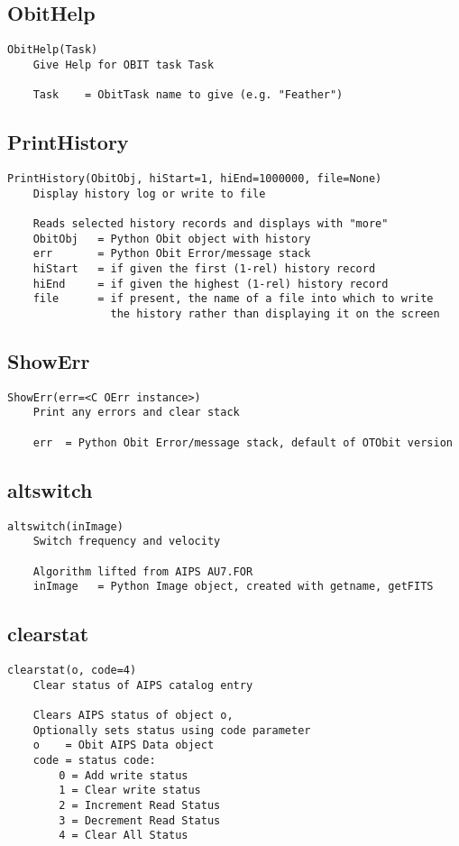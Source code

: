 \documentclass[11pt]{report}
\begin{document}
\subsection{ObitHelp}
\begin{verbatim}
ObitHelp(Task)
    Give Help for OBIT task Task
    
    Task    = ObitTask name to give (e.g. "Feather")
\end{verbatim}

\subsection{PrintHistory}
\begin{verbatim}
PrintHistory(ObitObj, hiStart=1, hiEnd=1000000, file=None)
    Display history log or write to file
    
    Reads selected history records and displays with "more"
    ObitObj   = Python Obit object with history
    err       = Python Obit Error/message stack
    hiStart   = if given the first (1-rel) history record
    hiEnd     = if given the highest (1-rel) history record
    file      = if present, the name of a file into which to write
                the history rather than displaying it on the screen
\end{verbatim}

\subsection{ShowErr}
\begin{verbatim}
ShowErr(err=<C OErr instance>)
    Print any errors and clear stack
    
    err  = Python Obit Error/message stack, default of OTObit version
\end{verbatim}

\subsection{altswitch}
\begin{verbatim}
altswitch(inImage)
    Switch frequency and velocity
    
    Algorithm lifted from AIPS AU7.FOR
    inImage   = Python Image object, created with getname, getFITS
\end{verbatim}

\subsection{clearstat}
\begin{verbatim}
clearstat(o, code=4)
    Clear status of AIPS catalog entry
    
    Clears AIPS status of object o,
    Optionally sets status using code parameter
    o    = Obit AIPS Data object
    code = status code:
        0 = Add write status
        1 = Clear write status
        2 = Increment Read Status
        3 = Decrement Read Status
        4 = Clear All Status
\end{verbatim}
\end{document}
